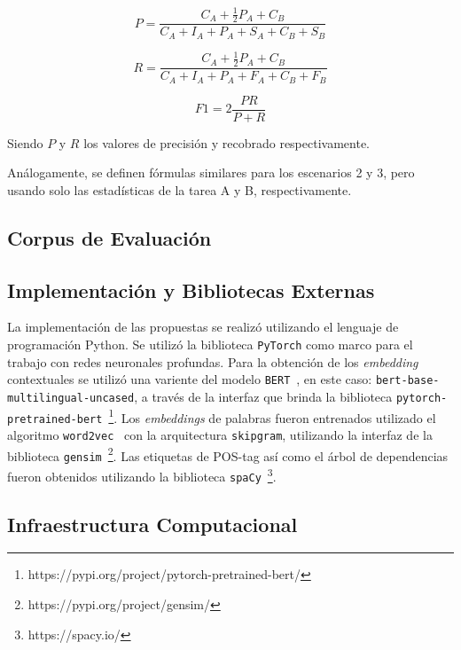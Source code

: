 \begin{equation*}
P = \frac{C_A + \frac{1}{2}P_A + C_B}{C_A + I_A + P_A + S_A + C_B + S_B}
\end{equation*}

\begin{equation*}
R = \frac{C_A + \frac{1}{2}P_A + C_B}{C_A + I_A + P_A + F_A + C_B + F_B}
\end{equation*}

\begin{equation*}
F1 = 2\frac{PR}{P+R}
\end{equation*}

Siendo $P$ y $R$ los valores de precisión y recobrado respectivamente.

Análogamente, se definen fórmulas similares para los escenarios 2 y 3, pero usando solo las estadísticas de la tarea A y B, respectivamente.

\subsection{Corpus de Evaluación}


\subsection{Implementación y Bibliotecas Externas}

La implementación de las propuestas se realizó utilizando el lenguaje de programación Python.
Se utilizó la biblioteca \texttt{PyTorch} como marco para el trabajo con redes neuronales profundas.
Para la obtención de los \textit{embedding} contextuales se utilizó una variente del modelo \texttt{BERT}~\cite{devlin2018bert}, en este caso: \texttt{bert-base-multilingual-uncased}, a través de la interfaz que brinda la biblioteca \texttt{pytorch-pretrained-bert}~\footnote{https://pypi.org/project/pytorch-pretrained-bert/}.
Los \textit{embeddings} de palabras fueron entrenados utilizado el algoritmo \texttt{word2vec}~\cite{mikolov2013efficient} con la arquitectura \texttt{skipgram}, utilizando la interfaz de la biblioteca \texttt{gensim}~\footnote{https://pypi.org/project/gensim/}.
Las etiquetas de POS-tag así como el árbol de dependencias fueron obtenidos utilizando la biblioteca \texttt{spaCy}~\footnote{https://spacy.io/}.

\subsection{Infraestructura Computacional}



